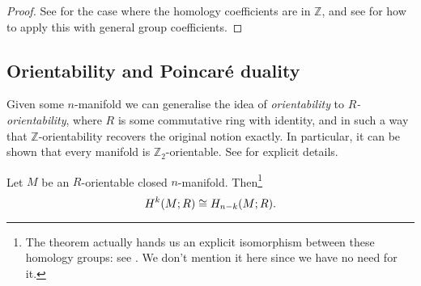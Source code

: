 \documentclass[12pt]{article}
\numberwithin{equation}{subsection}
\numberwithin{theorem}{subsection}
\numberwithin{lemma}{subsection}
\numberwithin{corollary}{subsection}
\numberwithin{definition}{subsection}
\numberwithin{example}{subsection}
\numberwithin{note}{subsection}
\newcommand{\zz}{\mathbb{Z}}
\newcommand{\nn}{\mathbb{N}}
\begin{document}
\begin{appendices}
            \begin{proof}
                See \cite[pp.~140,~141,~\S2.2]{hatcher2002algebraic} for the case where the homology coefficients are in $\zz$, and see \cite[Lemma~2.49,~\S2.2]{hatcher2002algebraic} for how to apply this with general group coefficients.
            \end{proof}







        \subsection{Orientability and Poincaré duality} %
        \label{sub:orientability_and_poincare_duality}

            Given some $n$-manifold we can generalise the idea of \emph{orientability} to \emph{$R$-orientability}, where $R$ is some commutative ring with identity, and in such a way that $\zz$-orientability recovers the original notion exactly.
            In particular, it can be shown that every manifold is $\zz_2$-orientable.
            See \cite[p.~235,~\S3.3]{hatcher2002algebraic} for explicit details.

            \begin{theorem}\label{th:poincare-duality}
                Let $M$ be an $R$-orientable closed $n$-manifold.
                Then\footnote{
                    The theorem actually hands us an explicit isomorphism between these homology groups: see \cite[Theorem~3.30,~\S3.3]{hatcher2002algebraic}.
                    We don't mention it here since we have no need for it.
                }
                \begin{equation*}
                    H^k(M;R)\cong H_{n-k}(M;R).\qedhere
                \end{equation*}
            \end{theorem}


\end{appendices}
\end{document}

